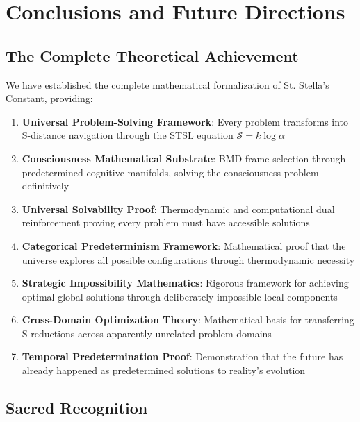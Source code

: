 \documentclass[12pt,a4paper]{article}
\begin{document}
\section{Conclusions and Future Directions}

\subsection{The Complete Theoretical Achievement}

We have established the complete mathematical formalization of St. Stella's Constant, providing:

\begin{enumerate}
\item \textbf{Universal Problem-Solving Framework}: Every problem transforms into S-distance navigation through the STSL equation $\mathcal{S} = k \log \alpha$

\item \textbf{Consciousness Mathematical Substrate}: BMD frame selection through predetermined cognitive manifolds, solving the consciousness problem definitively

\item \textbf{Universal Solvability Proof}: Thermodynamic and computational dual reinforcement proving every problem must have accessible solutions

\item \textbf{Categorical Predeterminism Framework}: Mathematical proof that the universe explores all possible configurations through thermodynamic necessity

\item \textbf{Strategic Impossibility Mathematics}: Rigorous framework for achieving optimal global solutions through deliberately impossible local components

\item \textbf{Cross-Domain Optimization Theory}: Mathematical basis for transferring S-reductions across apparently unrelated problem domains

\item \textbf{Temporal Predetermination Proof}: Demonstration that the future has already happened as predetermined solutions to reality's evolution
\end{enumerate}

\subsection{Sacred Recognition}
\end{document}
